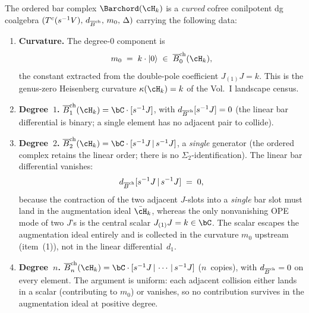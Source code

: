 \begin{theorem}
\label{thm:heisenberg-ordered-bar}
The ordered bar complex $\Barchord(\cH_k)$ is a \emph{curved}
cofree conilpotent dg coalgebra
$(T^c(s^{-1}V),\, d_{\overline{B}^{\mathrm{ch}}},\, m_0,\, \Delta)$
carrying the following data:
\begin{enumerate}[label=\textup{(\arabic*)}]
\item \textbf{Curvature.}\enspace
The degree-$0$ component is
\begin{equation}\label{eq:heisenberg-curvature-ordered}
m_0 \;=\; k\cdot\lvert 0\rangle
\;\in\;\Barch_0(\cH_k),
\end{equation}
the constant extracted from the double-pole coefficient
$J_{(1)}J=k$. This is the genus-zero Heisenberg curvature
$\kappa(\cH_k)=k$ of the Vol.~I landscape census.

\item \textbf{Degree~$1$.}\enspace
$\Barch_1(\cH_k) = \bC\cdot[\susp^{-1}J]$, with
$d_{\overline{B}^{\mathrm{ch}}}[s^{-1}J] = 0$
\textup{(}the linear bar differential is binary;
a single element has no adjacent pair to collide\textup{)}.

\item \textbf{Degree~$2$.}\enspace
$\Barch_2(\cH_k) = \bC\cdot[\susp^{-1}J \,|\, \susp^{-1}J]$,
a \emph{single} generator
\textup{(}the ordered complex retains the linear order;
there is no $\Sigma_2$-identification\textup{)}.
The linear bar differential vanishes:
\begin{equation}\label{eq:heisenberg-d2-ordered}
d_{\overline{B}^{\mathrm{ch}}}[s^{-1}J \,|\, s^{-1}J]
\;=\; 0,
\end{equation}
because the contraction of the two adjacent $J$-slots into a
\emph{single} bar slot must land in the augmentation ideal
$\bar\cH_k$, whereas the only nonvanishing OPE mode of two
$J$'s is the central scalar $J_{(1)}J=k\in\bC$. The scalar
escapes the augmentation ideal entirely and is collected in
the curvature $m_0$ upstream \textup{(}item~\textup{(1)}\textup{)},
not in the linear differential~$d_1$.

\item \textbf{Degree~$n$.}\enspace
$\Barch_n(\cH_k) = \bC\cdot[\susp^{-1}J \,|\,
\cdots \,|\, \susp^{-1}J]$ \textup{(}$n$~copies\textup{)},
with $d_{\overline{B}^{\mathrm{ch}}} = 0$ on every element. The argument is
uniform: each adjacent collision either lands in a scalar
\textup{(}contributing to $m_0$\textup{)} or vanishes, so no
contribution survives in the augmentation ideal at positive
degree.


\end{enumerate}
\end{theorem}
